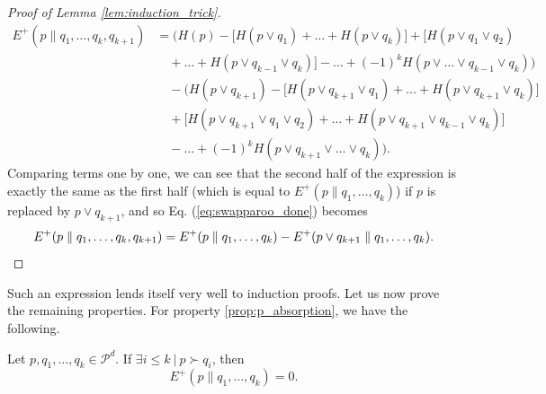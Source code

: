 \begin{proof}[Proof of Lemma \ref{lem:induction_trick}]
    \begin{align}
        E^+(p \parallel q_1, \dots, q_k, q_{k+1}) &= \Big(H(p) - \big[H(p \vee q_1) + \dots + H(p \vee q_k)\big] + \big[H(p \vee q_1 \vee q_2)\nonumber \\
                                                  &\quad + \dots + H(p \vee q_{k-1} \vee q_k)\big] - \dots + (-1)^{k} H(p \vee \dots \vee q_{k-1} \vee q_{k})\Big) \nonumber \\
                                                  &\quad - \Big(H(p \vee q_{k+1}) - \big[H(p \vee q_{k+1} \vee q_1) + \dots + H(p \vee q_{k+1} \vee q_k)\big]\nonumber \\
                                                  &\quad + \big[H(p \vee q_{k+1} \vee q_1 \vee q_2) + \dots + H(p \vee q_{k+1} \vee q_{k-1} \vee q_k)\big]\nonumber \\
                                                  &\quad - \dots + (-1)^{k} H(p \vee q_{k+1} \vee \dots \vee q_k)\Big).  \label{eq:swapparoo_done}
    \end{align}
    Comparing terms one by one, we can see that the second half of the expression is exactly the same as the first half (which is equal to $E^+(p \parallel q_1, \dots, q_k)$) if $p$ is replaced by $p \vee q_{k+1}$, and so Eq. (\ref{eq:swapparoo_done}) becomes
    \begin{equation}
        E^+(p \parallel q_1, \dots, q_k, q_{k+1}) = E^+(p \parallel q_1, \dots, q_k) - E^+(p \vee q_{k+1} \parallel q_1, \dots, q_k). \qedhere
    \end{equation}
\end{proof}

Such an expression lends itself very well to induction proofs. Let us now prove the remaining properties. For property \ref{prop:p_absorption}, we have the following.

\begin{appendix_lemma}
    Let $p, q_1, \dots, q_k \in \mathcal{P}^d$. If $\exists i \leq k \: | \: p \succ q_i$, then
    \begin{equation}
        E^+(p \parallel q_1, \dots, q_k) = 0.
    \end{equation}
\end{appendix_lemma}

